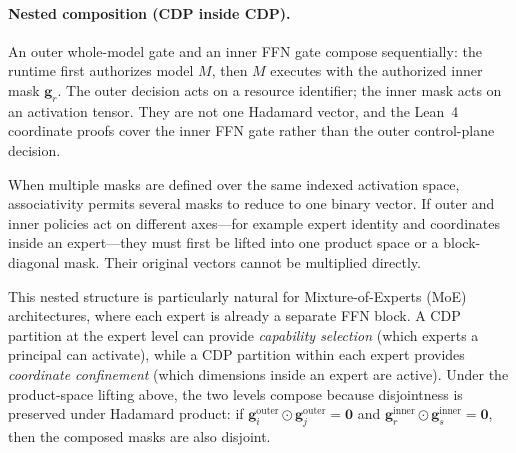 \documentclass[11pt,a4paper]{article}
\newcommand{\bg}{\mathbf{g}}
\begin{document}
\paragraph{Nested composition (CDP inside CDP).}
An outer whole-model gate and an inner FFN gate compose sequentially:
the runtime first authorizes model $M$, then $M$ executes with the
authorized inner mask $\bg_r$.  The outer decision acts on a resource
identifier; the inner mask acts on an activation tensor.  They are not
one Hadamard vector, and the Lean~4 coordinate proofs cover the inner
FFN gate rather than the outer control-plane decision.

When multiple masks are defined over the same indexed activation space,
associativity permits several masks to reduce to one binary vector.
If outer and inner policies act on different
axes---for example expert identity and coordinates inside an
expert---they must first be lifted into one product space or a
block-diagonal mask.  Their original vectors cannot be multiplied
directly.

This nested structure is particularly natural for
Mixture-of-Experts (MoE) architectures, where each expert is
already a separate FFN block.  A CDP partition at the expert level
can provide \emph{capability selection} (which experts a principal can
activate), while a CDP partition within each expert provides
\emph{coordinate confinement} (which dimensions inside an expert are
active).  Under the product-space lifting above, the two levels
compose because disjointness is preserved under Hadamard
product: if $\bg^{\mathrm{outer}}_i \odot \bg^{\mathrm{outer}}_j
= \mathbf{0}$ and $\bg^{\mathrm{inner}}_r \odot
\bg^{\mathrm{inner}}_s = \mathbf{0}$, then the composed masks are
also disjoint.
\end{document}
